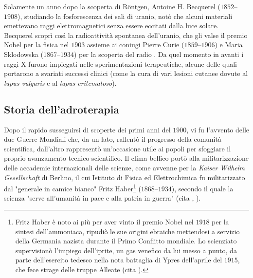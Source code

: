 \documentclass[12pt,a4paper,twoside]{report}
\begin{document}
	Solamente un anno dopo la scoperta di Röntgen, Antoine H. Becquerel ($1852$--$1908$), studiando la fosforescenza dei sali di uranio, notò che alcuni materiali emettevano raggi elettromagnetici senza essere eccitati dalla luce solare. Becquerel scoprì così la radioattività spontanea dell'uranio, che gli valse il premio Nobel per la fisica nel $1903$ assieme ai coniugi Pierre Curie ($1859$--$1906$) e Maria Sklodowska ($1867$--$1934$) per la scoperta del radio . Da quel momento in avanti i raggi X furono impiegati nelle sperimentazioni terapeutiche, alcune delle quali portarono a svariati successi clinici (come la cura di vari lesioni cutanee dovute al \textit{lupus vulgaris} e al \textit{lupus eritematoso}).
	
	\subsection{Storia dell'adroterapia}\label{storia_adroterapia}
	Dopo il rapido susseguirsi di scoperte dei primi anni del $1900$, vi fu l'avvento delle due Guerre Mondiali che, da un lato, rallentò il progresso della comunità scientifica, dall'altro rappresentò un'occasione utile ai popoli per sfoggiare il proprio avanzamento tecnico-scientifico. Il clima bellico portò alla militarizzazione delle accademie internazionali delle scienze, come avvenne per la \textit{Kaiser Wilhelm Gesellschaft} di Berlino, il cui Istituto di Fisica ed Elettrochimica fu militarizzato dal "generale in camice bianco" Fritz Haber\footnote{Fritz Haber è noto ai più per aver vinto il premio Nobel nel $1918$ per la sintesi dell'ammoniaca, ripudiò le sue origini ebraiche mettendosi a servizio della Germania nazista durante il Primo Conflitto mondiale. Lo scienziato supervisionò l'impiego dell'iprite, un gas venefico da lui messo a punto, da parte dell'esercito tedesco nella nota battaglia di Ypres dell’aprile del $1915$, che fece strage delle truppe Alleate (cita
		).} ($1868$--$1934$), secondo il quale la scienza "serve all’umanità in pace e alla patria in guerra" (cita
	,
	).
	
\end{document}
